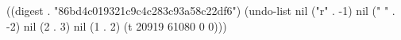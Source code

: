 
((digest . "86bd4c019321c9c4c283c93a58c22df6") (undo-list nil ("r" . -1) nil ("
" . -2) nil (2 . 3) nil (1 . 2) (t 20919 61080 0 0)))
